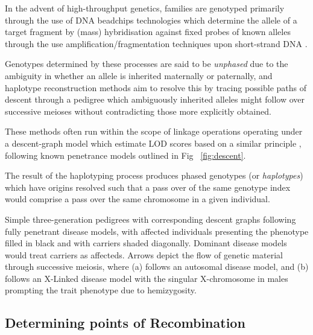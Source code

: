 In the advent of high-throughput genetics, families are genotyped primarily through the use of DNA beadchips technologies which determine the allele of a target fragment by (mass) hybridisation against fixed probes of known alleles through the use amplification/fragmentation techniques upon short-strand DNA \citep{oliphant2002beadarray}.

Genotypes determined by these processes are said to be \textit{unphased} due to the ambiguity in whether an allele is inherited maternally or paternally, and haplotype reconstruction methods aim to resolve this by tracing possible paths of descent through a pedigree which ambiguously inherited alleles might follow over successive meioses without contradicting those more explicitly obtained.

These methods often run within the scope of linkage operations operating under a descent-graph model which estimate LOD scores based on a similar principle \citep{sobel1996descent}, following known penetrance models outlined in Fig ~\ref{fig:descent}.

The result of the haplotyping process produces phased genotypes (or \textit{haplotypes}) which have origins resolved such that a pass over of the same genotype index would comprise a pass over the same chromosome in a given individual.

	{Simple three-generation pedigrees with corresponding descent graphs following fully penetrant disease models, with affected individuals presenting the phenotype filled in black and with carriers shaded diagonally. Dominant disease models would treat carriers as affecteds. Arrows depict the flow of genetic material through successive meiosis, where (a) follows an autosomal disease model, and (b) follows an X-Linked disease model with the singular X-chromosome in males prompting the trait phenotype due to hemizygosity.}

\vspace{-10pt}
\subsection{Determining points of Recombination}

